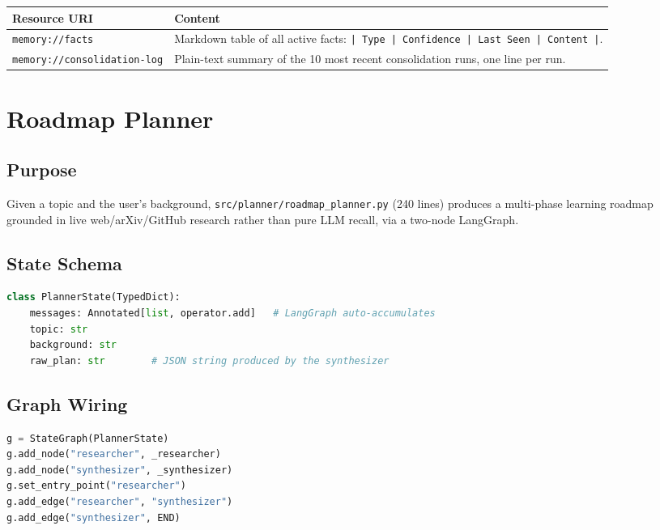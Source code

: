 \documentclass[11pt,a4paper]{report}
\newcommand{\code}[1]{\texttt{\small #1}}
\newcommand{\file}[1]{\texttt{\small\color{accent!70!black}#1}}
\begin{document}
\begin{longtable}{L{4.8cm}L{7.5cm}}
\toprule
\textbf{Resource URI} & \textbf{Content} \\
\midrule
\endhead
\code{memory://facts} & Markdown table of all active facts: \code{| Type | Confidence | Last Seen | Content |}. \\
\code{memory://consolidation-log} & Plain-text summary of the 10 most recent consolidation runs, one line per run. \\
\bottomrule
\end{longtable}

\chapter{Roadmap Planner}

\section{Purpose}

Given a topic and the user's background, \file{src/planner/roadmap\_planner.py} (240 lines) produces a multi-phase learning roadmap grounded in live web/arXiv/GitHub research rather than pure LLM recall, via a two-node LangGraph.

\section{State Schema}

\begin{lstlisting}[language=Python,caption={PlannerState}]
class PlannerState(TypedDict):
    messages: Annotated[list, operator.add]   # LangGraph auto-accumulates
    topic: str
    background: str
    raw_plan: str        # JSON string produced by the synthesizer
\end{lstlisting}

\section{Graph Wiring}

\begin{lstlisting}[language=Python]
g = StateGraph(PlannerState)
g.add_node("researcher", _researcher)
g.add_node("synthesizer", _synthesizer)
g.set_entry_point("researcher")
g.add_edge("researcher", "synthesizer")
g.add_edge("synthesizer", END)
\end{lstlisting}
\end{document}
